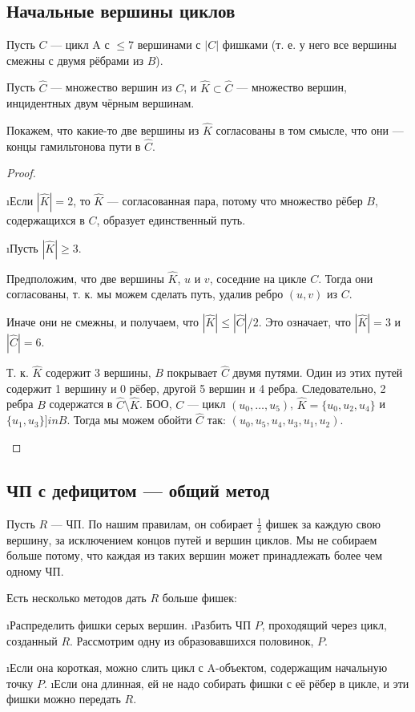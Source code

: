 \begin{proofstar}
\subsection{Начальные вершины циклов}
\begin{stmt}
Пусть $C$ --- цикл A с $\le 7$ вершинами с $|C|$ фишками (т. е. у него все вершины смежны с двумя рёбрами из $B$).

Пусть $\hat{C}$ --- множество вершин из $C$, и $\hat{K} \subset \hat{C}$ --- множество вершин, инцидентных двум чёрным вершинам. 

Покажем, что какие-то две вершины из $\hat{K}$ согласованы в том смысле, что они --- концы гамильтонова пути в $\hat{C}$.
\end{stmt}
\begin{proof}$ $\\
\begin{itemize}
\i Если $|\hat{K}| = 2$, то $\hat{K}$ --- согласованная пара, потому что множество рёбер $B$, содержащихся в $C$, образует единственный путь.

\i Пусть $|\hat{K}| \ge 3$. 

Предположим, что две вершины $\hat{K}$, $u$ и $v$, соседние на цикле $C$. Тогда они согласованы, т. к. мы можем сделать путь, удалив ребро $(u, v)$ из $C$.

Иначе они не смежны, и получаем, что $|\hat{K}| \le |\hat{C}|/2$. Это означает, что $|\hat{K}| = 3$ и $|\hat{C}| = 6$.

Т. к. $\hat{K}$ содержит 3 вершины, $B$ покрывает $\hat{C}$ двумя путями. Один из этих путей содержит 1 вершину и 0 рёбер, другой 5 вершин и 4 ребра. Следовательно, 2 ребра $B$ содержатся в $\hat{C} \setminus \hat{K}$. БОО, $C$ --- цикл $(u_0, \dots, u_5)$, $\hat{K} = \{u_0, u_2, u_4\}$ и $\{u_1, u_3\} ]in B$. Тогда мы можем обойти $\hat{C}$ так: $(u_0, u_5, u_4, u_3, u_1, u_2)$. \qedhere
\end{itemize}
\end{proof}

\subsection{ЧП с дефицитом --- общий метод}
Пусть $R$ --- ЧП. По нашим правилам, он собирает $\frac{1}{2}$ фишек за каждую свою вершину, за исключением концов путей и вершин циклов. Мы не собираем больше потому, что каждая из таких вершин может принадлежать более чем одному ЧП.

Есть несколько методов дать $R$ больше фишек:
\begin{itemize}
\i Распределить фишки серых вершин.
\i Разбить ЧП $P$, проходящий через цикл, созданный $R$. Рассмотрим одну из образовавшихся половинок, $P$.
\begin{itemize} 
\i Если она короткая, можно слить цикл с A-объектом, содержащим начальную точку $P$. 
\i Если она длинная, ей не надо собирать фишки с её рёбер в цикле, и эти фишки можно передать $R$.
\end{itemize}
\end{itemize}


\end{proofstar}
